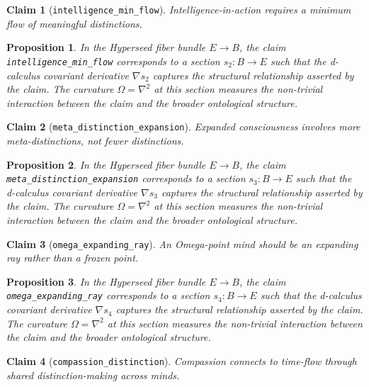 \documentclass{article}
\newtheorem{claim}{Claim}
\newtheorem{proposition}{Proposition}
\begin{document}
\begin{claim}[\texttt{intelligence_min_flow}]
Intelligence-in-action requires a minimum flow of meaningful distinctions.
\end{claim}

\begin{proposition}
In the Hyperseed fiber bundle $E \to B$, the claim \texttt{intelligence_min_flow} corresponds to a section $s_2: B \to E$ such that the d-calculus covariant derivative $\nabla s_2$ captures the structural relationship asserted by the claim. The curvature $\Omega = \nabla^2$ at this section measures the non-trivial interaction between the claim and the broader ontological structure.
\end{proposition}

\begin{claim}[\texttt{meta_distinction_expansion}]
Expanded consciousness involves more meta-distinctions, not fewer distinctions.
\end{claim}

\begin{proposition}
In the Hyperseed fiber bundle $E \to B$, the claim \texttt{meta_distinction_expansion} corresponds to a section $s_3: B \to E$ such that the d-calculus covariant derivative $\nabla s_3$ captures the structural relationship asserted by the claim. The curvature $\Omega = \nabla^2$ at this section measures the non-trivial interaction between the claim and the broader ontological structure.
\end{proposition}

\begin{claim}[\texttt{omega_expanding_ray}]
An Omega-point mind should be an expanding ray rather than a frozen point.
\end{claim}

\begin{proposition}
In the Hyperseed fiber bundle $E \to B$, the claim \texttt{omega_expanding_ray} corresponds to a section $s_4: B \to E$ such that the d-calculus covariant derivative $\nabla s_4$ captures the structural relationship asserted by the claim. The curvature $\Omega = \nabla^2$ at this section measures the non-trivial interaction between the claim and the broader ontological structure.
\end{proposition}

\begin{claim}[\texttt{compassion_distinction}]
Compassion connects to time-flow through shared distinction-making across minds.
\end{claim}
\end{document}
